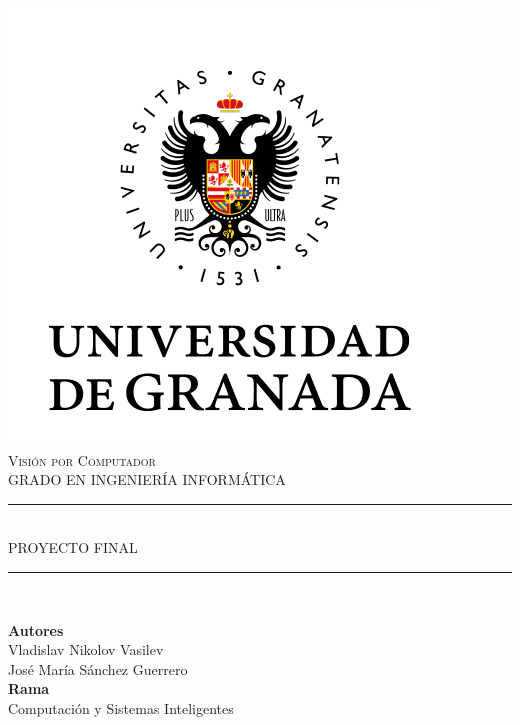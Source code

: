 \documentclass[11pt,a4paper]{article}
\newcommand{\asignatura}{Visión por Computador}
\newcommand{\autor}{Vladislav Nikolov Vasilev}
\begin{document}

\begin{titlepage}

\begin{minipage}{\textwidth}

\centering

\includegraphics[scale=0.5]{img/ugr.png}\\

\textsc{\Large \asignatura{}\\[0.2cm]}
\textsc{GRADO EN INGENIERÍA INFORMÁTICA}\\[1cm]

\noindent\rule[-1ex]{\textwidth}{1pt}\\[1.5ex]
\textsc{{\Huge PROYECTO FINAL\\[0.5ex]}}
\noindent\rule[-1ex]{\textwidth}{2pt}\\[3.5ex]

\end{minipage}

\vspace{1cm}

\begin{minipage}{\textwidth}

\centering

\textbf{Autores}\\ {\autor{}}\\{José María Sánchez Guerrero}\\[2ex]
\textbf{Rama}\\ {Computación y Sistemas Inteligentes}\\[2ex]
\vspace{0.3cm}


\end{minipage}
\end{titlepage}
\end{document}
